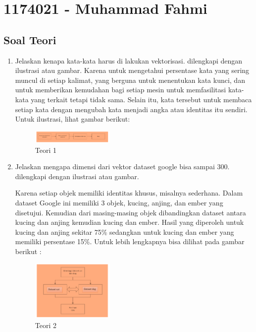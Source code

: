\section{1174021 - Muhammad Fahmi}
\subsection{Soal Teori}
\begin{enumerate}

	\item Jelaskan kenapa kata-kata harus di lakukan vektorisasi. dilengkapi dengan ilustrasi atau gambar.
	\hfill\break
	Karena untuk mengetahui persentase kata yang sering muncul di setiap kalimat, yang berguna untuk menentukan kata kunci, dan untuk memberikan kemudahan bagi setiap mesin untuk memfasilitasi kata-kata yang terkait tetapi tidak sama. Selain itu, kata tersebut untuk membaca setiap kata dengan mengubah kata menjadi angka atau identitas itu sendiri. Untuk ilustrasi, lihat gambar berikut: 

	\begin{figure}[H]
	\centering
		\includegraphics[width=4cm]{figures/1174021/tugas5/materi/teori1.PNG}
		\caption{Teori 1}
	\end{figure}

	\item Jelaskan mengapa dimensi dari vektor dataset google bisa sampai 300. dilengkapi dengan ilustrasi atau gambar.

	\hfill\break
	Karena setiap objek memiliki identitas khusus, misalnya sederhana. Dalam dataset Google ini memiliki 3 objek, kucing, anjing, dan ember yang disetujui. Kemudian dari masing-masing objek dibandingkan dataset antara kucing dan anjing kemudian kucing dan ember. Hasil yang diperoleh untuk kucing dan anjing sekitar 75\% sedangkan untuk kucing dan ember yang memiliki persentase 15\%. Untuk lebih lengkapnya bisa dilihat pada gambar berikut : 

	\begin{figure}[H]
	\centering
		\includegraphics[width=4cm]{figures/1174021/tugas5/materi/teori2.PNG}
		\caption{Teori 2}
	\end{figure}
	

\end{enumerate}
